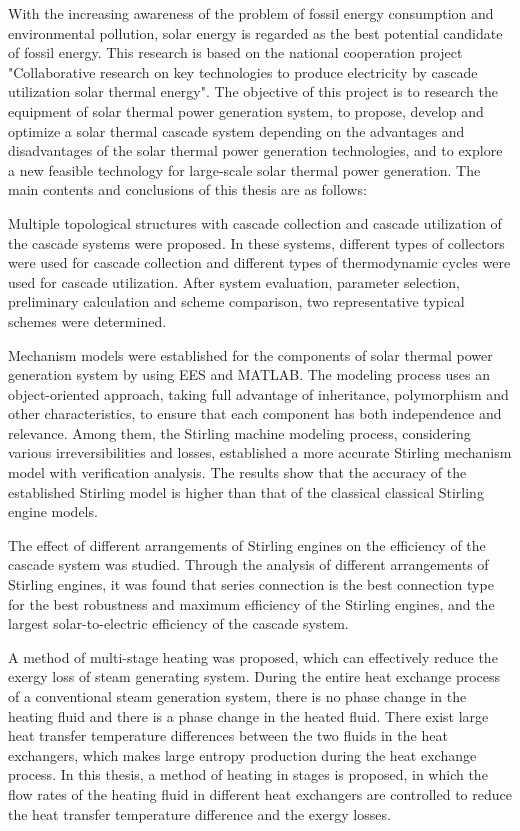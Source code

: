 \enabstract
{
With the increasing awareness of the problem of fossil energy consumption and environmental pollution, solar energy is regarded as the best potential candidate of fossil energy. This research is based on the national cooperation project "Collaborative research on key technologies to produce electricity by cascade utilization solar thermal energy". The objective of this project is to research the equipment of solar thermal power generation system, to propose, develop and optimize a solar thermal cascade system depending on the advantages and disadvantages of the solar thermal power generation technologies, and to explore a new feasible technology for large-scale solar thermal power generation. The main contents and conclusions of this thesis are as follows:

Multiple topological structures with cascade collection and cascade utilization of the cascade systems were proposed. In these systems, different types of collectors were used for cascade collection and different types of thermodynamic cycles were used for cascade utilization. After system evaluation, parameter selection, preliminary calculation and scheme comparison, two representative typical schemes were determined.

Mechanism models were established for the components of solar thermal power generation system by using EES and MATLAB. The modeling process uses an object-oriented approach, taking full advantage of inheritance, polymorphism and other characteristics, to ensure that each component has both independence and relevance. Among them, the Stirling machine modeling process, considering various irreversibilities and losses, established a more accurate Stirling mechanism model with verification analysis. The results show that the accuracy of the established Stirling model is higher than that of the classical classical Stirling engine models.

The effect of different arrangements of Stirling engines on the efficiency of the cascade system was studied. Through the analysis of different arrangements of Stirling engines, it was found that series connection is the best connection type for the best robustness and maximum efficiency of the Stirling engines, and the largest solar-to-electric efficiency of the cascade system.

A method of multi-stage heating was proposed, which can effectively reduce the exergy loss of steam generating system. During the entire heat exchange process of a conventional steam generation system, there is no phase change in the heating fluid and there is a phase change in the heated fluid. There exist large heat transfer temperature differences between the two fluids in the heat exchangers, which makes large entropy production during the heat exchange process. In this thesis, a method of heating in stages is proposed, in which the flow rates of the heating fluid in different heat exchangers are controlled to reduce the heat transfer temperature difference and the exergy losses. 

}
